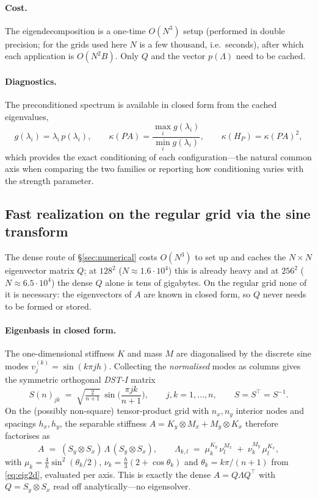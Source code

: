 \documentclass[11pt]{article}
\newcommand{\kk}{\kappa}
\begin{document}
\paragraph{Cost.}
The eigendecomposition is a one-time $O(N^3)$ setup (performed in double precision; for the
grids used here $N$ is a few thousand, i.e.\ seconds), after which each application is
$O(N^2 B)$. Only $Q$ and the vector $p(\Lambda)$ need to be cached.

\paragraph{Diagnostics.}
The preconditioned spectrum is available in closed form from the cached eigenvalues,
\begin{equation}
  g(\lambda_i) = \lambda_i\,p(\lambda_i),
  \qquad
  \kk(PA) = \frac{\max_i g(\lambda_i)}{\min_i g(\lambda_i)},
  \qquad
  \kk(H_P) = \kk(PA)^2,
\end{equation}
which provides the exact conditioning of each configuration---the natural common axis when
comparing the two families or reporting how conditioning varies with the strength parameter.

\subsection{Fast realization on the regular grid via the sine transform}
\label{sec:sine}

The dense route of \S\ref{sec:numerical} costs $O(N^3)$ to set up and caches the $N\times N$
eigenvector matrix $Q$; at $128^2$ ($N\approx1.6\cdot10^4$) this is already heavy and at
$256^2$ ($N\approx6.5\cdot10^4$) the dense $Q$ alone is tens of gigabytes. On the regular grid
none of it is necessary: the eigenvectors of $A$ are known in closed form, so $Q$ never needs to
be formed or stored.

\paragraph{Eigenbasis in closed form.}
The one-dimensional stiffness $K$ and mass $M$ are diagonalised by the discrete sine modes
$v^{(k)}_j=\sin(k\pi j h)$. Collecting the \emph{normalised} modes as columns gives the
symmetric orthogonal \emph{DST-I} matrix
\begin{equation}
  S(n)_{jk} \;=\; \sqrt{\tfrac{2}{n+1}}\,\sin\!\Big(\frac{\pi j k}{n+1}\Big),
  \qquad j,k=1,\dots,n,
  \qquad S = S^\top = S^{-1}.
  \label{eq:dst}
\end{equation}
On the (possibly non-square) tensor-product grid with $n_x,n_y$ interior nodes and
spacings $h_x,h_y$, the separable stiffness $A=K_y\otimes M_x+M_y\otimes K_x$ therefore
factorises as
\begin{equation}
  A \;=\; (S_y\otimes S_x)\,\Lambda\,(S_y\otimes S_x),
  \qquad
  \Lambda_{k,l} \;=\; \mu^{K_y}_k\,\nu^{M_x}_l \;+\; \nu^{M_y}_k\,\mu^{K_x}_l ,
  \label{eq:sinefact}
\end{equation}
with $\mu_k=\tfrac{4}{h}\sin^2(\theta_k/2)$, $\nu_k=\tfrac{h}{3}(2+\cos\theta_k)$ and
$\theta_k=k\pi/(n+1)$ from \eqref{eq:eig2d}, evaluated per axis. This is exactly the dense
$A=Q\Lambda Q^\top$ with $Q=S_y\otimes S_x$ read off analytically---no eigensolver.
\end{document}
